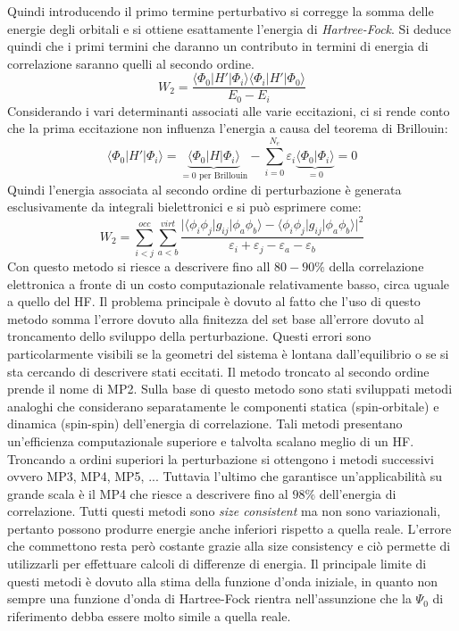 \documentclass[oneside]{amsbook}
\numberwithin{section}{chapter}
\numberwithin{equation}{section}
\numberwithin{figure}{section}
\begin{document}
Quindi introducendo il primo termine perturbativo si corregge la somma delle energie degli orbitali e si ottiene esattamente l'energia di \emph{Hartree-Fock}.
Si deduce quindi che i primi termini che daranno un contributo in termini di energia di correlazione saranno quelli al secondo ordine.
\begin{equation}
W_2= \frac{\langle \Phi_0 \vert H' \vert \Phi_i \rangle \langle \Phi_i \vert H' \vert \Phi_0 \rangle}{E_0-E_i}
\end{equation}
Considerando i vari determinanti associati alle varie eccitazioni, ci si rende conto che la prima eccitazione non influenza l'energia a causa del teorema di Brillouin:
\begin{equation}
\langle \Phi_0 \vert H' \vert \Phi_i \rangle = \underbrace{\langle \Phi_0 \vert H \vert \Phi_i \rangle}_{=0 \text{ per Brillouin}} - \sum \limits _{i=0} ^{N_e} \varepsilon_i \underbrace{\langle \Phi_0\vert\Phi_i\rangle}_{=0}=0
\end{equation}
Quindi l'energia associata al secondo ordine di perturbazione è generata esclusivamente da integrali bielettronici e si può esprimere come:
\begin{equation}
W_2=\sum \limits _{i<j} ^{occ}\sum \limits _{a<b} ^{virt} \frac{\vert\langle \phi_i \phi_j \vert g_{ij} \vert \phi_a \phi_b \rangle- \langle  \phi_i \phi_j\vert g_{ij} \vert \phi_a \phi_b \rangle \vert ^2}{\varepsilon_i+\varepsilon_j-\varepsilon_a-\varepsilon_b}
\end{equation}
Con questo metodo si riesce a descrivere fino all $80-90 \%$ della correlazione elettronica a fronte di un costo computazionale relativamente basso, circa uguale a quello del HF.
Il problema principale è dovuto al fatto che l'uso di questo metodo somma l'errore dovuto alla finitezza del set base all'errore dovuto al troncamento dello sviluppo della perturbazione. Questi errori sono particolarmente visibili se la geometri del sistema è lontana dall'equilibrio o se si sta cercando di descrivere stati eccitati.
Il metodo troncato al secondo ordine prende il nome di MP2. Sulla base di questo metodo sono stati sviluppati metodi analoghi che considerano separatamente le componenti statica (spin-orbitale) e dinamica (spin-spin) dell'energia di correlazione. Tali metodi presentano un'efficienza computazionale superiore e talvolta scalano meglio di un HF.\\
Troncando a ordini superiori la perturbazione si ottengono i metodi successivi ovvero MP3, MP4, MP5, ... Tuttavia l'ultimo che garantisce un'applicabilità su grande scala è il MP4 che riesce a descrivere fino al $98\%$ dell'energia di correlazione.
Tutti questi metodi sono \emph{size consistent} ma non sono variazionali, pertanto possono produrre energie anche inferiori rispetto a quella reale. L'errore che commettono resta però costante grazie alla size consistency e ciò permette di utilizzarli per effettuare calcoli di differenze di energia.
Il principale limite di questi metodi è dovuto alla stima della funzione d'onda iniziale, in quanto non sempre una funzione d'onda di Hartree-Fock rientra nell'assunzione che la $\Psi_0$ di riferimento debba essere molto simile a quella reale. 
\end{document}
